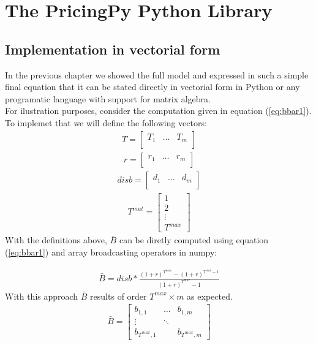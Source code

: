 

\chapter{The PricingPy Python Library}
\section{Implementation in vectorial form}
In the previous chapter we showed the full model and expressed in such a simple final equation that it can be stated directly in vectorial form in Python or any programatic language with support for matrix algebra.\\

For ilustration purposes, consider the computation given in equation (\ref{eq:bbar1}). To implemet that we will define the following vectors:
\begin{align}
T = \begin{bmatrix} 
    T_{1} & \dots &  T_{m} \\
    \end{bmatrix}    
\end{align}
\begin{align}
r = \begin{bmatrix} 
    r_{1} & \dots &  r_{m} \\
    \end{bmatrix}    
\end{align}
\begin{align}
disb = \begin{bmatrix} 
    d_{1} & \dots &  d_{m} \\
    \end{bmatrix}    
\end{align}
\begin{align}
T^{mat} = \begin{bmatrix} 
     1  \\
     2  \\
    \vdots  \\
    T^{max} 
    \end{bmatrix}       
\end{align}
With the definitions above, $\bar{B}$ can be diretly computed using equation (\ref{eq:bbar1}) and array broadcasting operators in numpy:

\begin{align}
    \bar{B} = disb*\frac{(1+r)^{T^{max}}-(1+r)^{T^{mat}-1}}{(1+r)^{T^{max}}-1}
\end{align}
With this approach $\bar{B}$ results of order $T^{max}\times m$ as expected.
\begin{align}
\bar{B} = \begin{bmatrix} 
    b_{1,1} & \dots &  b_{1,m} \\
    \vdots & \ddots & \\
    b_{T^{max},1} &        & b_{T^{max},m} 
    \end{bmatrix}    
\end{align}

